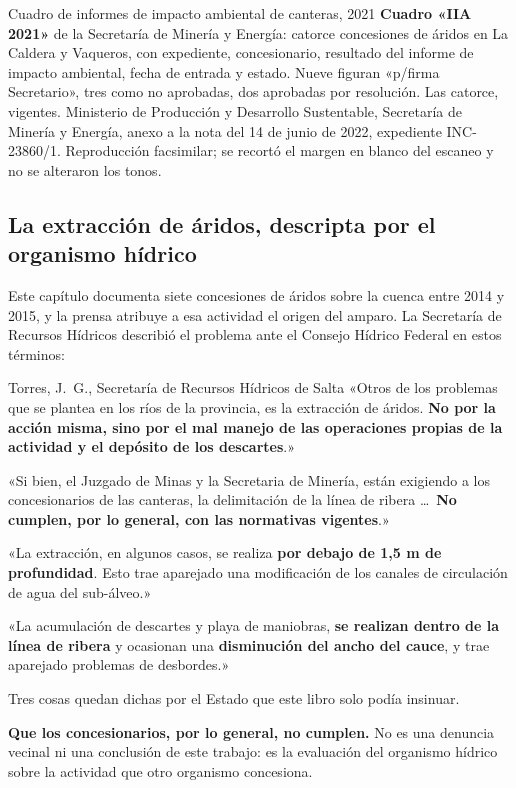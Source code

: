 %
{Cuadro de informes de impacto ambiental de canteras, 2021}%
{\textbf{Cuadro «IIA 2021»} de la Secretaría de Minería y Energía: catorce concesiones de
áridos en La Caldera y Vaqueros, con expediente, concesionario, resultado del informe de
impacto ambiental, fecha de entrada y estado. Nueve figuran «p/firma Secretario», tres como no
aprobadas, dos aprobadas por resolución. Las catorce, vigentes.}%
{Ministerio de Producción y Desarrollo Sustentable, Secretaría de Minería y Energía, anexo a la
nota del 14 de junio de 2022, expediente INC-23860/1. Reproducción facsimilar; se recortó el
margen en blanco del escaneo y no se alteraron los tonos.}

\subsection*{La extracción de áridos, descripta por el organismo hídrico}

Este capítulo documenta siete concesiones de áridos sobre la cuenca entre 2014 y 2015, y la
prensa atribuye a esa actividad el origen del amparo. La Secretaría de Recursos Hídricos
describió el problema ante el Consejo Hídrico Federal en estos términos:

\begin{ficha}{Torres, J.\ G., Secretaría de Recursos Hídricos de Salta}
«Otros de los problemas que se plantea en los ríos de la provincia, es la extracción de
áridos. \textbf{No por la acción misma, sino por el mal manejo de las operaciones propias de
la actividad y el depósito de los descartes}.»

«Si bien, el Juzgado de Minas y la Secretaria de Minería, están exigiendo a los concesionarios
de las canteras, la delimitación de la línea de ribera \ldots\ \textbf{No cumplen, por lo
general, con las normativas vigentes}.»

«La extracción, en algunos casos, se realiza \textbf{por debajo de 1,5 m de profundidad}. Esto
trae aparejado una modificación de los canales de circulación de agua del sub-álveo.»

«La acumulación de descartes y playa de maniobras, \textbf{se realizan dentro de la línea de
ribera} y ocasionan una \textbf{disminución del ancho del cauce}, y trae aparejado problemas
de desbordes.»
\end{ficha}

Tres cosas quedan dichas por el Estado que este libro solo podía insinuar.

\textbf{Que los concesionarios, por lo general, no cumplen.} No es una denuncia vecinal ni una
conclusión de este trabajo: es la evaluación del organismo hídrico sobre la actividad que
otro organismo concesiona.

